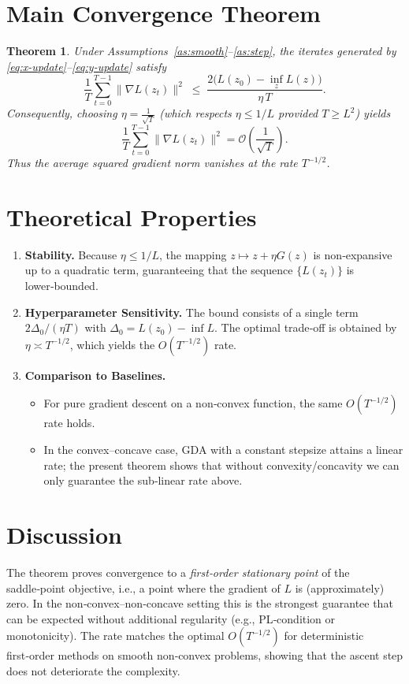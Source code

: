 \documentclass{article}
\newtheorem{theorem}{Theorem}
\begin{document}
\section*{Main Convergence Theorem}
\begin{theorem}\label{thm:main}
Under Assumptions~\ref{as:smooth}--\ref{as:step}, the iterates generated by
\eqref{eq:x-update}--\eqref{eq:y-update} satisfy
\[
\frac{1}{T}\sum_{t=0}^{T-1}\|\nabla L(z_t)\|^{2}
\;\le\;
\frac{2\big(L(z_0)-\inf_{z}L(z)\big)}{\eta\,T}.
\]
Consequently, choosing $\displaystyle\eta = \frac{1}{\sqrt{T}}$ (which respects
$\eta\le 1/L$ provided $T\ge L^{2}$) yields
\[
\frac{1}{T}\sum_{t=0}^{T-1}\|\nabla L(z_t)\|^{2}
= \mathcal{O}\!\left(\frac{1}{\sqrt{T}}\right).
\]
Thus the average squared gradient norm vanishes at the rate $T^{-1/2}$.
\end{theorem}

\section*{Theoretical Properties}
\begin{enumerate}[label=\arabic*.]
\item \textbf{Stability.}  Because $\eta\le 1/L$, the mapping $z\mapsto z+\eta G(z)$ is
non‑expansive up to a quadratic term, guaranteeing that the sequence $\{L(z_t)\}$ is
lower‑bounded.
\item \textbf{Hyperparameter Sensitivity.}  The bound consists of a single term
$2\Delta_{0}/(\eta T)$ with $\Delta_{0}=L(z_0)-\inf L$.  The optimal trade‑off is
obtained by $\eta\asymp T^{-1/2}$, which yields the $O(T^{-1/2})$ rate.
\item \textbf{Comparison to Baselines.}
    \begin{itemize}
        \item For pure gradient descent on a non‑convex function, the same $O(T^{-1/2})$ rate holds.
        \item In the convex–concave case, GDA with a constant stepsize attains a linear rate;
              the present theorem shows that without convexity/concavity we can only
              guarantee the sub‑linear rate above.
    \end{itemize}
\end{enumerate}

\section*{Discussion}
The theorem proves convergence to a \emph{first‑order stationary point} of the
saddle‑point objective, i.e., a point where the gradient of $L$ is (approximately)
zero.  In the non‑convex–non‑concave setting this is the strongest guarantee
that can be expected without additional regularity (e.g., PL‑condition or
monotonicity).  The rate matches the optimal $O(T^{-1/2})$ for deterministic
first‑order methods on smooth non‑convex problems, showing that the ascent step
does not deteriorate the complexity.
\end{document}
